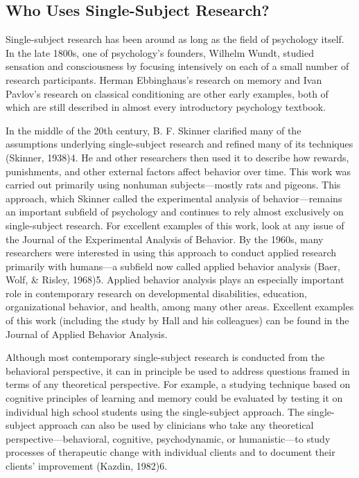\subsection{Who Uses Single-Subject Research?}

Single-subject research has been around as long as the field of psychology itself. In the late 1800s, one of psychology's founders, Wilhelm Wundt, studied sensation and consciousness by focusing intensively on each of a small number of research participants. Herman Ebbinghaus's research on memory and Ivan Pavlov's research on classical conditioning are other early examples, both of which are still described in almost every introductory psychology textbook.

In the middle of the 20th century, B. F. Skinner clarified many of the assumptions underlying single-subject research and refined many of its techniques (Skinner, 1938)4. He and other researchers then used it to describe how rewards, punishments, and other external factors affect behavior over time. This work was carried out primarily using nonhuman subjects---mostly rats and pigeons. This approach, which Skinner called the experimental analysis of behavior---remains an important subfield of psychology and continues to rely almost exclusively on single-subject research. For excellent examples of this work, look at any issue of the Journal of the Experimental Analysis of Behavior. By the 1960s, many researchers were interested in using this approach to conduct applied research primarily with humans---a subfield now called applied behavior analysis (Baer, Wolf, \& Risley, 1968)5. Applied behavior analysis plays an especially important role in contemporary research on developmental disabilities, education, organizational behavior, and health, among many other areas. Excellent examples of this work (including the study by Hall and his colleagues) can be found in the Journal of Applied Behavior Analysis.

Although most contemporary single-subject research is conducted from the behavioral perspective, it can in principle be used to address questions framed in terms of any theoretical perspective. For example, a studying technique based on cognitive principles of learning and memory could be evaluated by testing it on individual high school students using the single-subject approach. The single-subject approach can also be used by clinicians who take any theoretical perspective---behavioral, cognitive, psychodynamic, or humanistic---to study processes of therapeutic change with individual clients and to document their clients' improvement (Kazdin, 1982)6.


